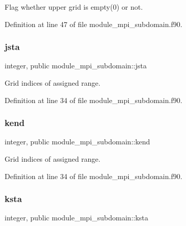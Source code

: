 Flag whether upper grid is empty(0) or not. 



Definition at line 47 of file module\+\_\+mpi\+\_\+subdomain.\+f90.

\mbox{\label{namespacemodule__mpi__subdomain_a87c16acea97b6100c4629bda8a090169}} 
\subsubsection{\texorpdfstring{jsta}{jsta}}
{\footnotesize\ttfamily integer, public module\+\_\+mpi\+\_\+subdomain\+::jsta}



Grid indices of assigned range. 



Definition at line 34 of file module\+\_\+mpi\+\_\+subdomain.\+f90.

\mbox{\label{namespacemodule__mpi__subdomain_a2d63d8a25db336795c14328ed3b31047}} 
\subsubsection{\texorpdfstring{kend}{kend}}
{\footnotesize\ttfamily integer, public module\+\_\+mpi\+\_\+subdomain\+::kend}



Grid indices of assigned range. 



Definition at line 34 of file module\+\_\+mpi\+\_\+subdomain.\+f90.

\mbox{\label{namespacemodule__mpi__subdomain_a3eab4b23cbc7b4ab032da06300bfca6f}} 
\subsubsection{\texorpdfstring{ksta}{ksta}}
{\footnotesize\ttfamily integer, public module\+\_\+mpi\+\_\+subdomain\+::ksta}



